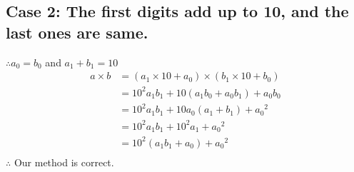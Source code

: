 \documentclass[12pt]{article}
\begin{document}
\subsection{Case 2: The first digits add up to 10, and the last ones are same.}
$\therefore a_0 = b_0$ and $a_1 + b_1 = 10$
\begin{align*}
a \times b &= (a_1 \times 10 + a_0) \times (b_1 \times 10 + b_0)\\
&= 10^2a_1b_1 + 10(a_1b_0 + a_0b_1) + a_0b_0\\
&= 10^2a_1b_1 + 10a_0(a_1 + b_1) + {a_0}^2\\
&= 10^2a_1b_1 + 10^2a_1 + {a_0}^2\\
&= 10^2(a_1b_1 + a_0) + {a_0}^2\\
\end{align*}
$\therefore$ Our method is correct.~\cite{wikib}

{}

\end{document}

